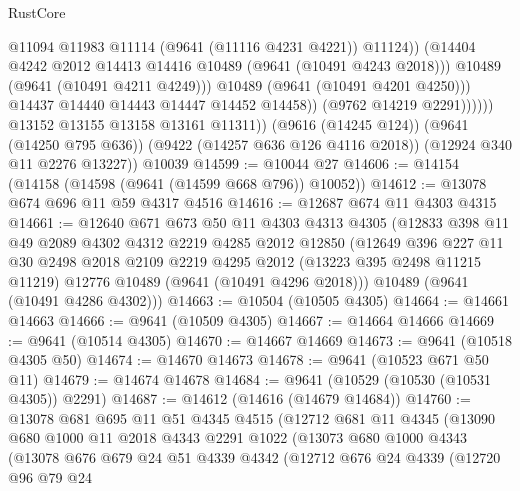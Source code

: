 \begin{lexlean}{RustCore}
\begin{coremodule}
                                @11094
                                @11983
                                @11114
                                (@9641 (@11116 @4231 @4221))
                                @11124))
                            (@14404 @4242 @2012 @14413 @14416 @10489 (@9641 (@10491 @4243 @2018)))
                            @10489
                            (@9641 (@10491 @4211 @4249)))
                          @10489
                          (@9641 (@10491 @4201 @4250)))
                        @14437
                        @14440
                        @14443
                        @14447
                        @14452
                        @14458))
                    (@9762 @14219 @2291))))))
          @13152
          @13155
          @13158
          @13161
          @11311))
      (@9616 (@14245 @124))
      (@9641 (@14250 @795 @636))
      (@9422 (@14257 @636 @126 @4116 @2018))
      (@12924 @340 @11 @2276 @13227))
    @10039
@14599 := @10044 @27
@14606 := @14154 (@14158 (@14598 (@9641 (@14599 @668 @796)) @10052))
@14612 := @13078 @674 @696 @11 @59 @4317 @4516
@14616 := @12687 @674 @11 @4303 @4315
@14661 := @12640
    @671
    @673
    @50
    @11
    @4303
    @4313
    @4305
    (@12833
      @398
      @11
      @49
      @2089
      @4302
      @4312
      @2219
      @4285
      @2012
      @12850
      (@12649
        @396
        @227
        @11
        @30
        @2498
        @2018
        @2109
        @2219
        @4295
        @2012
        (@13223 @395 @2498 @11215 @11219)
        @12776
        @10489
        (@9641 (@10491 @4296 @2018)))
      @10489
      (@9641 (@10491 @4286 @4302)))
@14663 := @10504 (@10505 @4305)
@14664 := @14661 @14663
@14666 := @9641 (@10509 @4305)
@14667 := @14664 @14666
@14669 := @9641 (@10514 @4305)
@14670 := @14667 @14669
@14673 := @9641 (@10518 @4305 @50)
@14674 := @14670 @14673
@14678 := @9641 (@10523 @671 @50 @11)
@14679 := @14674 @14678
@14684 := @9641 (@10529 (@10530 (@10531 @4305)) @2291)
@14687 := @14612 (@14616 (@14679 @14684))
@14760 := @13078
    @681
    @695
    @11
    @51
    @4345
    @4515
    (@12712
      @681
      @11
      @4345
      (@13090
        @680
        @1000
        @11
        @2018
        @4343
        @2291
        @1022
        (@13073
          @680
          @1000
          @4343
          (@13078
            @676
            @679
            @24
            @51
            @4339
            @4342
            (@12712
              @676
              @24
              @4339
              (@12720
                @96
                @79
                @24

\end{coremodule}
\end{lexlean}
